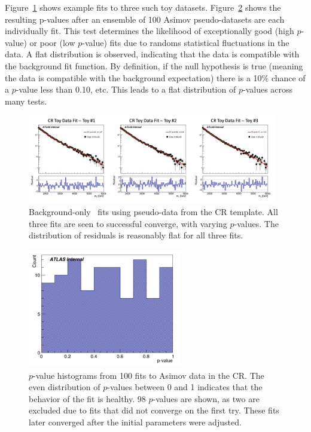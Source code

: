 Figure~\ref{fig:bkgfit_data} shows example fits to three such toy datasets.
Figure~\ref{fig:asimov_hist} shows the resulting p-values after an ensemble of 100 Asimov pseudo-datasets are each individually fit. 
This test determines the likelihood of exceptionally good (high $p$-value) or poor (low $p$-value) fits due to randoms statistical fluctuations in the data. 
A flat distribution is observed, indicating that the data is compatible with the background fit function. 
By definition, if the null hypothesis is true (meaning the data is compatible with the background expectation) there is a 10\% chance of a $p$-value less than 0.10, etc.
This leads to a flat distribution of $p$-values across many tests.

\begin{figure}[!htbp]
\centering
   \includegraphics[width=0.97\textwidth]{figures/stats/bkgfit_data_cr}
    \caption{Background-only \mt~fits using pseudo-data from the CR template. All three fits are seen to successful converge, with varying $p$-values. The distribution of residuals is reasonably flat for all three fits.
     \label{fig:bkgfit_data}}
\end{figure}

\begin{figure}[!htbp]
\centering
   \includegraphics[width=0.6\textwidth]{figures/stats/asimov_cr_hist}
    \caption{$p$-value histograms from 100 fits to Asimov data in the CR. The even distribution of $p$-values between 0 and 1 indicates that the behavior of the fit is healthy. 98 $p$-values are shown, as two are excluded due to fits that did not converge on the first try. These fits later converged after the initial parameters were adjusted. %
    \label{fig:asimov_hist}}
\end{figure}

